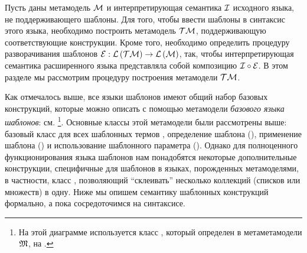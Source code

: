 Пусть даны метамодель $\mathcal{M}$ и интерпретирующая семантика $\mathcal{I}$ исходного языка, не поддерживающего шаблоны. Для того, чтобы ввести шаблоны в синтаксис этого языка, необходимо построить метамодель $\mathcal{TM}$, поддерживающую соответствующие конструкции. Кроме того, необходимо определить процедуру разворачивания шаблонов $\mathcal{E} : \mathcal{L}\left(\mathcal{TM}\right) \rightarrow \mathcal{L}\left(\mathcal{M}\right)$, так, чтобы интерпретирующая семантика расширенного языка представляла собой композицию $\mathcal{I} \circ \mathcal{E}$. В этом разделе мы рассмотрим процедуру построения метамодели $\mathcal{TM}$.

Как отмечалось выше, все языки шаблонов имеют общий набор базовых конструкций, которые можно описать с помощью метамодели \emph{базового языка шаблонов}: см. \footnote{На этой диаграмме используется класс , который определен в метаметамодели $\mathfrak{M}$, на .
}. 
%
%
Основные классы этой метамодели были рассмотрены выше: базовый класс для всех шаблонных термов , определение шаблона (), применение шаблона () и использование шаблонного параметра (). Однако для полноценного функционирования языка шаблонов нам понадобятся некоторые дополнительные конструкции, специфичные для шаблонов в языках, порожденных метамоделями, в частности, класс , позволяющий ``склеивать'' несколько коллекций (списков или множеств) в одну. Ниже мы опишем семантику шаблонных конструкций формально, а пока сосредоточимся на синтаксисе.

